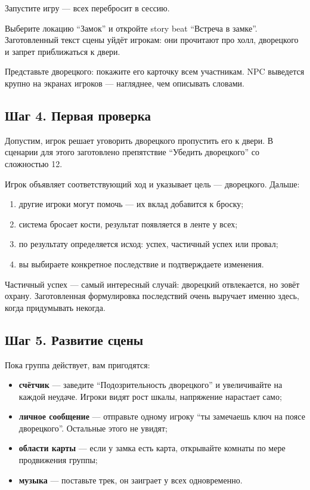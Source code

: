 Запустите игру --- всех перебросит в сессию.

Выберите локацию ``Замок'' и откройте story beat ``Встреча в замке''. Заготовленный текст сцены уйдёт игрокам: они прочитают про холл, дворецкого и запрет приближаться к двери.

Представьте дворецкого: покажите его карточку всем участникам. NPC выведется крупно на экранах игроков --- нагляднее, чем описывать словами.

\subsection{Шаг 4. Первая проверка}\label{tut:first-session:first-roll}

Допустим, игрок решает уговорить дворецкого пропустить его к двери. В сценарии для этого заготовлено препятствие ``Убедить дворецкого'' со сложностью 12.

Игрок объявляет соответствующий ход и указывает цель --- дворецкого. Дальше:

\begin{enumerate}
\item другие игроки могут помочь --- их вклад добавится к броску;
\item система бросает кости, результат появляется в ленте у всех;
\item по результату определяется исход: успех, частичный успех или провал;
\item вы выбираете конкретное последствие и подтверждаете изменения.
\end{enumerate}

Частичный успех --- самый интересный случай: дворецкий отвлекается, но зовёт охрану. Заготовленная формулировка последствий очень выручает именно здесь, когда придумывать некогда.

\subsection{Шаг 5. Развитие сцены}\label{tut:first-session:develop}

Пока группа действует, вам пригодятся:

\begin{itemize}
\item \textbf{счётчик} --- заведите ``Подозрительность дворецкого'' и увеличивайте на каждой неудаче. Игроки видят рост шкалы, напряжение нарастает само;
\item \textbf{личное сообщение} --- отправьте одному игроку ``ты замечаешь ключ на поясе дворецкого''. Остальные этого не увидят;
\item \textbf{области карты} --- если у замка есть карта, открывайте комнаты по мере продвижения группы;
\item \textbf{музыка} --- поставьте трек, он заиграет у всех одновременно.
\end{itemize}

